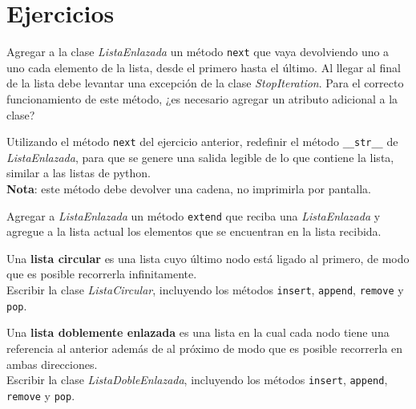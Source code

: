 \newpage
\section{Ejercicios}

\begin{ejercicio}
Agregar a la clase {\it ListaEnlazada} un método \verb!next! que vaya
devolviendo uno a uno cada elemento de la lista, desde el primero hasta el
último.  Al llegar al final de la lista debe levantar una excepción de la
clase {\it StopIteration}.  Para el correcto funcionamiento de este método, ¿es
necesario agregar un atributo adicional a la clase?
\end{ejercicio}

\begin{ejercicio}
Utilizando el método \verb!next! del ejercicio anterior, redefinir el
método \verb!__str__! de {\it ListaEnlazada}, para que se genere una salida
legible de lo que contiene la lista, similar a las listas de python. \\
{\bf Nota}: este método debe devolver una cadena, no imprimirla por
pantalla.
\end{ejercicio}

\begin{ejercicio}
Agregar a {\it ListaEnlazada} un método \verb!extend! que reciba una {\it
ListaEnlazada} y agregue a la lista actual los elementos que se encuentran
en la lista recibida.
\end{ejercicio}

%

\begin{ejercicio}
Una {\bf lista circular} es una lista cuyo último nodo está ligado al primero,
de modo que es posible recorrerla infinitamente.  \\
Escribir la clase {\it ListaCircular}, incluyendo los métodos \verb!insert!,
\verb!append!, \verb!remove! y \verb!pop!.
\end{ejercicio}

\begin{ejercicio}
Una {\bf lista doblemente enlazada} es una lista en la cual cada nodo tiene
una referencia al anterior además de al próximo de modo que es posible
recorrerla en ambas direcciones. \\
Escribir la clase {\it ListaDobleEnlazada}, incluyendo los métodos
\verb!insert!, \verb!append!, \verb!remove! y \verb!pop!.
\end{ejercicio}

